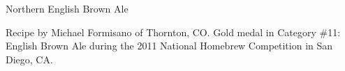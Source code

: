 \documentclass[parskip=half,fontsize=9pt,oneside]{scrbook}
\begin{document}
\mainmatter


\begin{recipe}{Northern English Brown Ale}

\begin{aboutblock}
Recipe by Michael Formisano of Thornton, CO. Gold medal in Category \#11: English
Brown Ale during the 2011 National Homebrew Competition in San Diego, CA.
\sourceaha
\end{aboutblock}


\begin{methodandtiming}

\begin{mashsteps}
\end{mashsteps}

\begin{fermentationsteps}
\end{fermentationsteps}

\end{methodandtiming}

\recipebreak

\begin{ingredientsblock}

\begin{malts}
\end{malts}

\begin{hops}
\end{hops}


\end{ingredientsblock}

\end{recipe}


\end{document}
